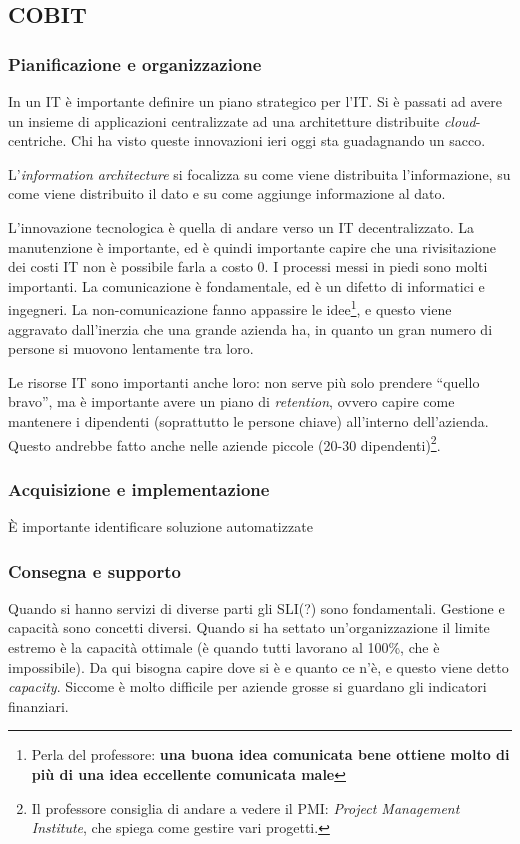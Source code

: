 \subsection{COBIT}
\label{COBIT}

\subsubsection{Pianificazione e organizzazione}

In un IT è importante definire un piano strategico per l'IT. Si è passati ad 
avere un insieme di applicazioni centralizzate ad una architetture distribuite 
\textit{cloud}-centriche. Chi ha visto queste innovazioni ieri oggi sta 
guadagnando un sacco.

L'\textit{information architecture} si focalizza su come viene distribuita 
l'informazione, su come viene distribuito il dato e su come aggiunge 
informazione al dato.

L'innovazione tecnologica è quella di andare verso un IT decentralizzato. La 
manutenzione è importante, ed è quindi importante capire che una rivisitazione 
dei costi IT non è possibile farla a costo 0. I processi messi in piedi sono 
molti importanti. La comunicazione è fondamentale, ed è un difetto di 
informatici e ingegneri. La non-comunicazione fanno appassire le 
idee\footnote{Perla del professore: \textbf{una buona idea comunicata bene 
ottiene molto di più di una idea eccellente comunicata male}}, e questo viene 
aggravato dall'inerzia che una grande azienda ha, in quanto un gran numero di 
persone si muovono lentamente tra loro.

Le risorse IT sono importanti anche loro: non serve più solo prendere ``quello 
bravo'', ma è importante avere un piano di \textit{retention}, ovvero capire 
come mantenere i dipendenti (soprattutto le persone chiave) all'interno 
dell'azienda. Questo andrebbe fatto anche nelle aziende piccole (20-30 
dipendenti)\footnote{Il professore consiglia di andare a vedere il PMI: 
\textit{Project Management Institute}, che spiega come gestire vari progetti.}.

\subsubsection{Acquisizione e implementazione}

È importante identificare soluzione automatizzate 


\subsubsection{Consegna e supporto}

Quando si hanno servizi di diverse parti gli SLI(?) sono fondamentali.
Gestione e capacità sono concetti diversi. Quando si ha settato 
un'organizzazione il limite estremo è la capacità ottimale (è quando tutti 
lavorano al 100\%, che è impossibile). Da qui bisogna capire dove si è e quanto 
ce n'è, e questo viene detto \textit{capacity}. Siccome è molto difficile per 
aziende grosse si guardano gli indicatori finanziari.
